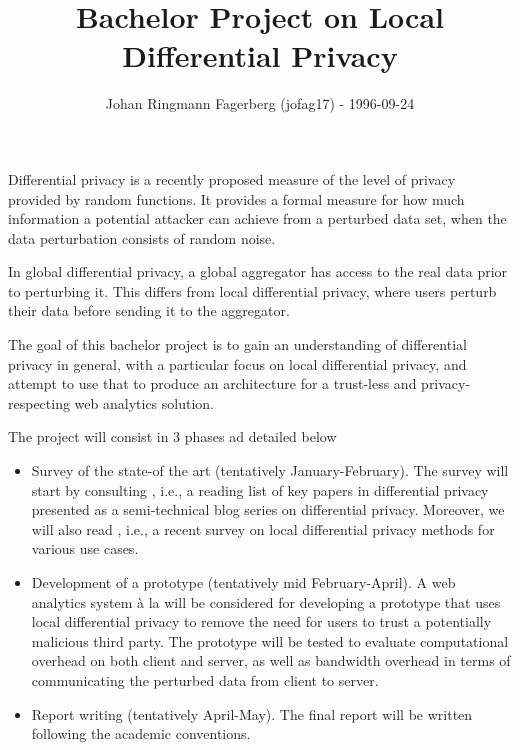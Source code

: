 \documentclass[a4paper]{article}
\title{\vspace{-2cm}Bachelor Project on Local Differential Privacy}
\author{Johan Ringmann Fagerberg (jofag17) - 1996-09-24}
\date{}
\begin{document}
\maketitle

\begin{description}[style=nextline]
    \item[Motivation] Differential privacy is a recently proposed measure of the level of privacy provided by random functions. It provides a formal measure for how much information a potential attacker can achieve from a perturbed data set, when the data perturbation consists of random noise.
    
    In global differential privacy, a global aggregator has access to the real data prior to perturbing it. This differs from local differential privacy, where users perturb their data before sending it to the aggregator.
    
    The goal of this bachelor project is to gain an understanding of 
differential privacy in general, with a particular focus on local differential 
privacy, and attempt to use that to produce an architecture for a trust-less 
and privacy-respecting web analytics solution.

\item[Plan]
    The project will consist in 3 phases ad detailed below
    \begin{itemize}
     \item Survey of the state-of the art (tentatively January-February). 
The survey will start by consulting \cite{desfontain_overview}, i.e., a reading 
list of key papers in differential privacy presented as a semi-technical blog 
series on differential privacy. Moreover, we will also read 
\cite{localdiffpriv_survey}, i.e., a recent survey on local differential privacy 
methods for various use cases.
\item
Development of a prototype (tentatively mid February-April). A web analytics 
system à la \cite{webanalytics_2012} will be considered for developing a 
prototype that uses local differential privacy
to remove the need for users to trust a potentially malicious 
third party. The prototype will be tested to evaluate computational overhead on both client and server, as well as bandwidth overhead in terms of communicating the perturbed data from client to server.
\item
Report writing (tentatively April-May). The final report will be written 
following the academic conventions.
    \end{itemize}
    

\end{description}
\end{document}
